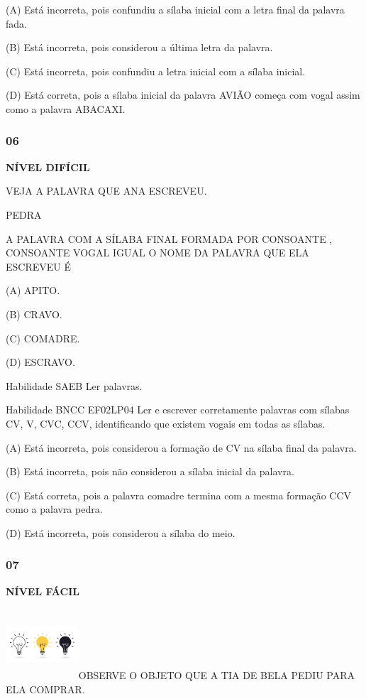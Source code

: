 (A) Está incorreta, pois confundiu a sílaba inicial com a letra final da
palavra fada.

(B) Está incorreta, pois considerou a última letra da palavra.

(C) Está incorreta, pois confundiu a letra inicial com a sílaba inicial.

(D) Está correta, pois a sílaba inicial da palavra AVIÃO começa com
vogal assim como a palavra ABACAXI.

\subsubsection{06}\label{section-148}

\textbf{NÍVEL DIFÍCIL}

VEJA A PALAVRA QUE ANA ESCREVEU.

PEDRA

A PALAVRA COM A SÍLABA FINAL FORMADA POR CONSOANTE , CONSOANTE VOGAL
IGUAL O NOME DA PALAVRA QUE ELA ESCREVEU É

(A) APITO.

(B) CRAVO.

(C) COMADRE.

(D) ESCRAVO.

Habilidade SAEB Ler palavras.

Habilidade BNCC EF02LP04 Ler e escrever corretamente palavras com
sílabas CV, V, CVC, CCV, identificando que existem vogais em todas as
sílabas.

(A) Está incorreta, pois considerou a formação de CV na sílaba final da
palavra.

(B) Está incorreta, pois não considerou a sílaba inicial da palavra.

(C) Está correta, pois a palavra comadre termina com a mesma formação
CCV como a palavra pedra.

(D) Está incorreta, pois considerou a sílaba do meio.

\subsubsection{07}\label{section-149}

\textbf{NÍVEL FÁCIL}

\includegraphics[width=1.07025in,height=1.04487in]{media/image178.jpeg}OBSERVE
O OBJETO QUE A TIA DE BELA PEDIU PARA ELA COMPRAR.

